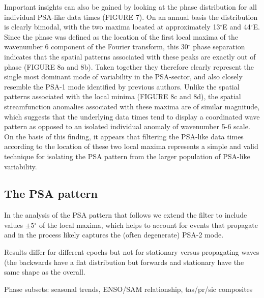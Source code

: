 Important insights can also be gained by looking at the phase distribution for all individual PSA-like data times (FIGURE 7). On an annual basis the distribution is clearly bimodal, with the two maxima located at approximately 13$^{\circ}$E and 44$^{\circ}$E. Since the phase was defined as the location of the first local maxima of the wavenumber 6 component of the Fourier transform, this 30$^{\circ}$ phase separation indicates that the spatial patterns associated with these peaks are exactly out of phase (FIGURE 8a and 8b). Taken together they therefore clearly represent the single most dominant mode of variability in the PSA-sector, and also closely resemble the PSA-1 mode identified by previous authors. Unlike the spatial patterns associated with the local minima (FIGURE 8c and 8d), the spatial streamfunction anomalies associated with these maxima are of similar magnitude, which suggests that the underlying data times tend to display a coordinated wave pattern as opposed to an isolated individual anomaly of wavenumber 5-6 scale. On the basis of this finding, it appears that filtering the PSA-like data times according to the location of these two local maxima represents a simple and valid technique for isolating the PSA pattern from the larger population of PSA-like variability. 

\subsection{The PSA pattern}


In the analysis of the PSA pattern that follows we extend the filter to include values $\pm$5$^{\circ}$ of the local maxima, which helps to account for events that propagate and in the process likely captures the (often degenerate) PSA-2 mode. 

Results differ for different epochs but not for stationary versus propagating waves (the backwards have a flat distribution but forwards and stationary have the same shape as the overall.

Phase subsets: seasonal trends, ENSO/SAM relationship, tas/pr/sic composites







